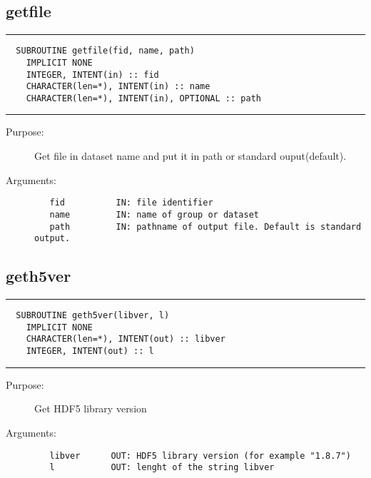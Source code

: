 \documentclass[a4paper]{article}
\begin{document}
\subsection{getfile}

\par
\addvspace{\medskipamount}
\nopagebreak\hrule
\begin{verbatim}
  SUBROUTINE getfile(fid, name, path)
    IMPLICIT NONE
    INTEGER, INTENT(in) :: fid
    CHARACTER(len=*), INTENT(in) :: name
    CHARACTER(len=*), INTENT(in), OPTIONAL :: path
\end{verbatim}
\nopagebreak\hrule
\addvspace{\medskipamount}

\begin{description}
\item[Purpose:] \mbox{}

Get file in dataset name and put it in path or standard ouput(default).

\item[Arguments:] \mbox{}

\begin{verbatim}
   fid          IN: file identifier
   name         IN: name of group or dataset
   path         IN: pathname of output file. Default is standard output.

\end{verbatim}


\end{description}





\subsection{geth5ver}

\par
\addvspace{\medskipamount}
\nopagebreak\hrule
\begin{verbatim}
  SUBROUTINE geth5ver(libver, l)
    IMPLICIT NONE
    CHARACTER(len=*), INTENT(out) :: libver
    INTEGER, INTENT(out) :: l
\end{verbatim}
\nopagebreak\hrule
\addvspace{\medskipamount}

\begin{description}
\item[Purpose:] \mbox{}

Get HDF5 library version

\item[Arguments:] \mbox{}

\begin{verbatim}
   libver      OUT: HDF5 library version (for example "1.8.7")
   l           OUT: lenght of the string libver

\end{verbatim}


\end{description}
\end{document}
